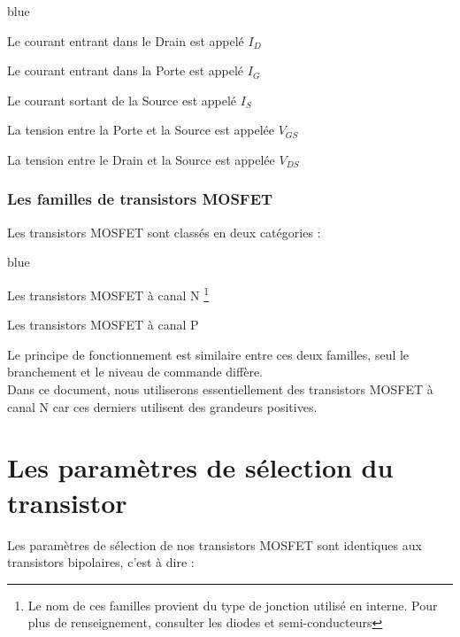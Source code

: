 {     \begin{items}{blue}{\Triangle}
     
       \item Le courant entrant dans le Drain est appelé $I_{D}$
       \item Le courant entrant dans la Porte est appelé $I_{G}$
       \item Le courant sortant de la Source est appelé $I_{S}$

       \item La tension entre la Porte et la Source est appelée $V_{GS}$
       \item La tension entre le Drain et la Source est appelée $V_{DS}$
     \end{items}
     
     \subsubsection{Les familles de transistors MOSFET}

     Les transistors MOSFET sont classés en deux catégories : 
     
     \begin{items}{blue}{\Triangle}
     
       \item Les transistors MOSFET à canal N \footnote{Le nom de ces familles provient du type de jonction utilisé en interne. Pour plus de renseignement, consulter les diodes et semi-conducteurs}
       \item Les transistors MOSFET à canal P
     
     \end{items}
     
     Le principe de fonctionnement est similaire entre ces deux familles, seul le branchement et le niveau de commande diffère.\\
     Dans ce document, nous utiliserons essentiellement des transistors MOSFET à canal N car ces derniers utilisent des grandeurs 
     positives.
     

     \section{Les paramètres de sélection du transistor}
     
     Les paramètres de sélection de nos transistors MOSFET sont identiques aux transistors bipolaires, c'est à dire :
     
}

